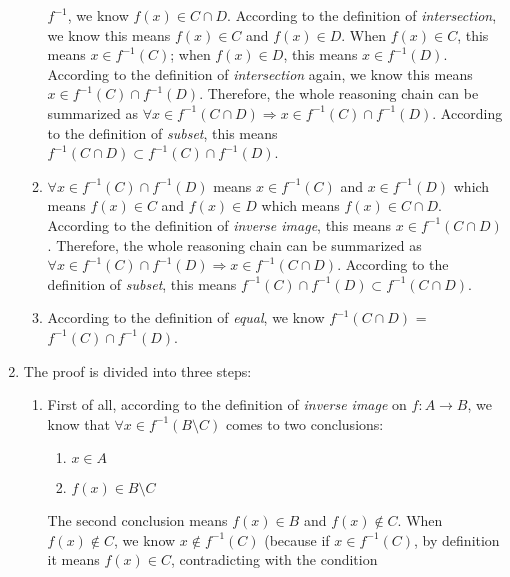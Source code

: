 \documentclass[12pt, letterpaper, oneside]{book}
\begin{document}
\begin{enumerate}
\begin{enumerate}
                $f^{-1}$, we know $f(x) \in C \cap D$. According to the definition of
                \textit{intersection}, we know this means $f(x) \in C$ and $f(x) \in D$.
                When $f(x) \in C$, this means $x \in f^{-1}(C)$; when $f(x) \in D$, this
                means $x \in f^{-1}(D)$. According to the definition of \textit{
                  intersection} again, we know this means $x \in f^{-1}(C) \cap
                  f^{-1}(D)$. Therefore, the whole reasoning chain can be summarized as
                $\forall x \in f^{-1}(C \cap D) \Rightarrow x \in f^{-1}(C) \cap
                  f^{-1}(D)$. According to the definition of \textit{subset}, this means
                $f^{-1}(C \cap D) \subset f^{-1}(C) \cap f^{-1}(D)$.
          \item $\forall x \in f^{-1}(C) \cap f^{-1}(D)$ means $x \in f^{-1}(C)$ and
                $x \in f^{-1}(D)$ which means $f(x) \in C$ and $f(x) \in D$ which means
                $f(x) \in C \cap D$. According to the definition of \textit{inverse
                  image}, this means $x \in f^{-1}(C \cap D)$. Therefore, the whole
                reasoning chain can be summarized as $\forall x \in f^{-1}(C) \cap
                  f^{-1}(D) \Rightarrow x \in f^{-1}(C \cap D)$. According to the
                definition of \textit{subset}, this means $f^{-1}(C) \cap f^{-1}(D)
                  \subset f^{-1}(C \cap D)$.
          \item According to the definition of \textit{equal}, we know $f^{-1}(C
                  \cap D)$ = $f^{-1}(C) \cap f^{-1}(D)$.
        \end{enumerate}
  \item The proof is divided into three steps:
        \begin{enumerate}
          \item First of all, according to the definition of \textit{inverse image}
                on $f: A \rightarrow B$, we know that $\forall x \in f^{-1}(B \setminus
                  C)$ comes to two conclusions:
                \begin{enumerate}
                  \item $x \in A$
                  \item $f(x) \in B \setminus C$
                \end{enumerate}
                The second conclusion means $f(x) \in B$ and $f(x) \notin C$. When $f(x)
                  \notin C$, we know $x \notin f^{-1}(C)$ (because if $x \in f^{-1}(C)$,
                by definition it means $f(x) \in C$, contradicting with the condition

\end{enumerate}
\end{enumerate}
\end{document}
